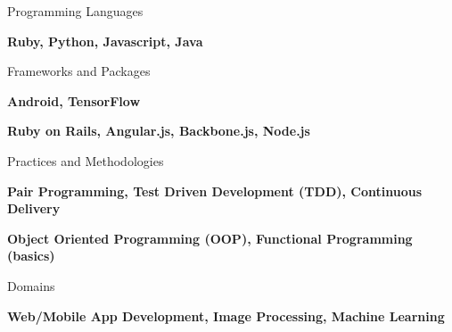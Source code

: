 \begin{cventries}
  \cventry
    {Programming Languages}
    {}
    {}
    {}
    {
      \begin{cvitems}
        \item {\textbf{Ruby, Python, Javascript, Java}}
      \end{cvitems}
    }
  \cventry
    {Frameworks and Packages}
    {}
    {}
    {}
    {
      \begin{cvitems}
        \item {\textbf{Android, TensorFlow}}
        \item {\textbf{Ruby on Rails, Angular.js, Backbone.js, Node.js}}
      \end{cvitems}
    }
  \cventry
    {Practices and Methodologies}
    {}
    {}
    {}
    {
      \begin{cvitems}
        \item {\textbf{Pair Programming, Test Driven Development (TDD), Continuous Delivery}}
        \item {\textbf{Object Oriented Programming (OOP), Functional Programming (basics)}}
      \end{cvitems}
    }
  \cventry
    {Domains}
    {}
    {}
    {}
    {
      \begin{cvitems}
        \item {\textbf{Web/Mobile App Development, Image Processing, Machine Learning}}
      \end{cvitems}
    }
\end{cventries}

